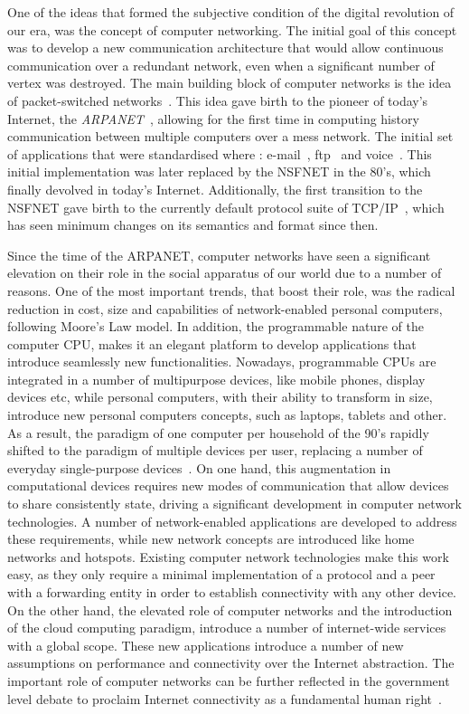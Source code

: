 One of the ideas that formed the subjective condition of the digital revolution
of our era, was the concept of computer networking. The initial goal of this
concept was to develop a new communication architecture that would allow
continuous communication over a redundant network, even when a significant
number of vertex was destroyed.  The main building block of computer networks is
the idea of packet-switched networks~\cite{Licklider1963}.  This idea gave birth
to the pioneer of today's Internet, the {\it ARPANET}~\cite{Mills:1987tt},
allowing for the first time in computing history communication between multiple
computers over a mess network. The initial set of applications that were
standardised where : e-mail~\cite{RFC0561}, ftp~\cite{RFC0354} and
voice~\cite{RFC0741}. This initial implementation was later replaced by the
NSFNET in the 80's, which finally devolved in today's Internet. Additionally,
the first transition to the NSFNET gave birth to the currently default protocol
suite of TCP/IP~\cite{Clark:1988}, which has seen minimum changes on its
semantics and format since then.

Since the time of the ARPANET, computer networks have seen a significant
elevation on their role in the social apparatus of our world due to a number of
reasons. One of the most important trends, that boost their role, was the
radical reduction in cost, size and capabilities of network-enabled personal
computers, following Moore's Law model. In addition, the programmable nature of
the computer CPU, makes it an elegant platform to develop applications that
introduce seamlessly new functionalities. Nowadays, programmable CPUs are
integrated in a number of multipurpose devices, like mobile phones, display
devices etc, while personal computers, with their ability to transform in size,
introduce new personal computers concepts, such as laptops, tablets and other.
As a result, the paradigm of one computer per household of the 90's rapidly
shifted to the paradigm of multiple devices per user, replacing a number of
everyday single-purpose devices~\cite{Dholakia:2006vn}.  On one hand, this
augmentation in computational devices requires new modes of communication that
allow devices to share consistently state, driving a significant development in
computer network technologies. A number of network-enabled applications are
developed to address these requirements, while new network concepts are
introduced like home networks and hotspots. Existing computer network
technologies make this work easy, as they only require a minimal implementation
of a protocol and a peer with a forwarding entity in order to establish
connectivity with any other device. On the other hand, the elevated role
of computer networks and the introduction of the cloud computing paradigm,
introduce a number of internet-wide services with a global scope. These new
applications introduce a number of new assumptions on performance and
connectivity over the Internet abstraction.  The important role of computer
networks can be further reflected in the government level debate to proclaim
Internet connectivity as a fundamental human right~\cite{klang2005human}.

